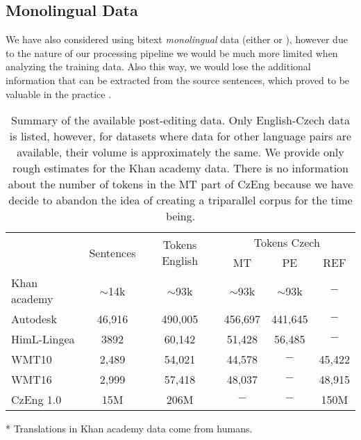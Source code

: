 \subsection{Monolingual Data}

We have also considered using bitext \emph{monolingual} data (either 
or ), however due to the nature of our processing
pipeline we would be much more limited when analyzing the training data. Also this way, we would
lose the additional information that can be extracted from the source sentences, which proved to be valuable in the practice \citep{biblio:RoMaDEPFIXA2012}.


\begin{table*}[t]
\centering
\small

\begin{threeparttable}
\begin{tabular}{|l|c|c|c|c|c|}
\hline
\multirow{2}{*}{}  &  \multirow{2}{*}{\hash{} Sentences}  &  \multirow{2}{*}{\hash{} Tokens English}  &  \multicolumn{3}{c|}{\hash{} Tokens Czech}  \\
\cline{4-6}
&  &  & MT & PE & REF \\
\hline
Khan academy & $\sim$14k & $\sim$93k & $\sim$93k\tnote{*} & $\sim$93k & $-$ \\
\hline
Autodesk & 46,916 & 490,005 & 456,697 & 441,645 & $-$ \\
\hline
HimL-Lingea & 3892 & 60,142 & 51,428 & 56,485 & $-$ \\
\hline
WMT10 & 2,489 & 54,021 & 44,578 & $-$ & 45,422 \\
\hline
WMT16 & 2,999 & 57,418 & 48,037 & $-$ & 48,915 \\
\hline
CzEng 1.0 & 15M & 206M & $-$ & $-$ & 150M \\
\hline
\end{tabular}
\begin{tablenotes}
\item[*] Translations in Khan academy data come from humans.
\end{tablenotes}
\end{threeparttable}
\caption{Summary of the available post-editing data. Only English-Czech data is listed, however, for datasets
where data for other language pairs are available, their volume is approximately the same. We provide only rough estimates for the Khan academy data.
There is no information about the number of tokens in the MT part of CzEng because we have decide to abandon the
idea of creating a triparallel corpus for the time being.
}
\label{avail-data}
\end{table*}

